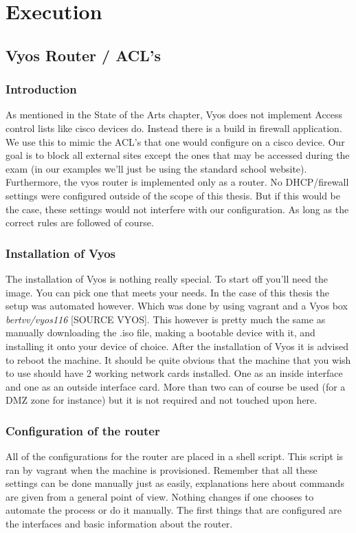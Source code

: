 
\chapter{Execution}
\label{ch:methodologie}

\section{Vyos Router / ACL's}
\subsection{Introduction}
As mentioned in the State of the Arts chapter, Vyos does not implement Access control lists like cisco devices do. Instead there is a build in firewall application. We use this to mimic the ACL's that one would configure on a cisco device. Our goal is to block all external sites except the ones that may be accessed during the exam (in our examples we'll just be using the standard school website). Furthermore, the vyos router is implemented only as a router. No DHCP/firewall settings were configured outside of the scope of this thesis. But if this would be the case, these settings would not interfere with our configuration. As long as the correct rules are followed of course. 
\subsection{Installation of Vyos}
The installation of Vyos is nothing really special. To start off you'll need the image. You can pick one that meets your needs. In the case of this thesis the setup was automated however. Which was done by using vagrant and a Vyos box \textit{bertvv/vyos116} [SOURCE VYOS]. This however is pretty much the same as manually downloading the .iso file, making a bootable device with it, and installing it onto your device of choice. After the installation of Vyos it is advised  to reboot the machine. It should be quite obvious that the machine that you wish to use should have 2 working network cards installed. One as an inside interface and one as an outside interface card. More than two can of course be used (for a DMZ zone for instance) but it is not required and not touched upon here.
\subsection{Configuration of the router}
All of the configurations for the router are placed in a shell script. This script is ran by vagrant when the machine is provisioned. Remember that all these settings can be done manually just as easily, explanations here about commands are given from a general point of view. Nothing changes if one chooses to automate the process or do it manually. The first things that are configured are the interfaces and basic information about the router.\\


